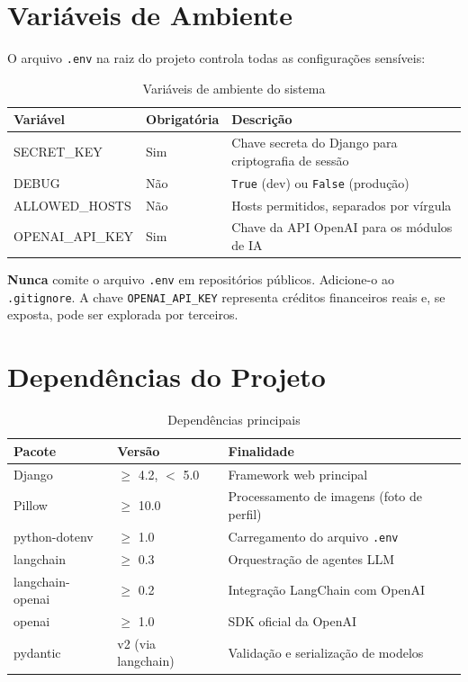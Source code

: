 \documentclass[12pt, a4paper, oneside]{report}
\begin{document}
\section{Variáveis de Ambiente}

O arquivo \texttt{.env} na raiz do projeto controla todas as configurações sensíveis:

\begin{table}[H]
\centering
\caption{Variáveis de ambiente do sistema}
\begin{tabularx}{\textwidth}{>{\ttfamily}l l X}
\toprule
Variável & Obrigatória & Descrição \\
\midrule
SECRET\_KEY & Sim & Chave secreta do Django para criptografia de sessão \\
DEBUG & Não & \texttt{True} (dev) ou \texttt{False} (produção) \\
ALLOWED\_HOSTS & Não & Hosts permitidos, separados por vírgula \\
OPENAI\_API\_KEY & Sim & Chave da API OpenAI para os módulos de IA \\
\bottomrule
\end{tabularx}
\end{table}

\begin{dangerbox}
\textbf{Nunca} comite o arquivo \texttt{.env} em repositórios públicos. Adicione-o ao \texttt{.gitignore}. A chave \texttt{OPENAI\_API\_KEY} representa créditos financeiros reais e, se exposta, pode ser explorada por terceiros.
\end{dangerbox}

\section{Dependências do Projeto}

\begin{table}[H]
\centering
\caption{Dependências principais}
\begin{tabularx}{\textwidth}{>{\ttfamily}l l X}
\toprule
Pacote & Versão & Finalidade \\
\midrule
Django & $\geq$ 4.2, $<$ 5.0 & Framework web principal \\
Pillow & $\geq$ 10.0 & Processamento de imagens (foto de perfil) \\
python-dotenv & $\geq$ 1.0 & Carregamento do arquivo \texttt{.env} \\
langchain & $\geq$ 0.3 & Orquestração de agentes LLM \\
langchain-openai & $\geq$ 0.2 & Integração LangChain com OpenAI \\
openai & $\geq$ 1.0 & SDK oficial da OpenAI \\
pydantic & v2 (via langchain) & Validação e serialização de modelos \\
\bottomrule
\end{tabularx}
\end{table}
\end{document}
